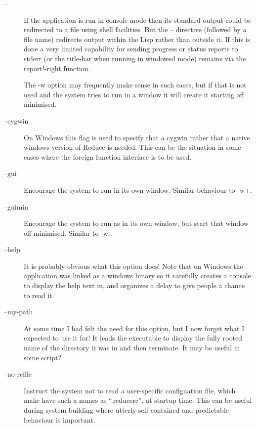 \documentclass[a4paper,11pt]{article}
\begin{document}
\begin{description}

\item [{\ttfamily --}] \index{{\ttfamily --}}
If the application is run in console mode then its standard output could
be redirected to a file using shell facilities. But the {\ttfamily --}
directive (followed by a file name) redirects output within the Lisp rather
than outside it. If this is done a very limited capability for sending
progress or status reports to stderr (or the title-bar when running in windowed
mode) remains via the {\ttfamily report!-right} function.
  
The {\ttfamily -w} option may frequently make sense in such cases, but if that
is not used and the system tries to run in a window it will create it
starting off minimised.

\item [{\ttfamily --cygwin}] 
On Windows this flag is used to specify that a cygwin rather that a native
windows version of Reduce is needed. This can be the situation in some
cases where the foreign function interface is to be used.

\item [{\ttfamily --gui}] 
Encourage the system to run in its own window. Similar behaviour
to {\ttfamily -w+}.

\item [{\ttfamily --guimin}] 
Encourage the system to run as in its own window, but
start that window off minimised. Similar
to {\ttfamily -w.}.

\item [{\ttfamily --help}] 
It is probably obvious what this option does! Note that on Windows the
application was linked as a windows binary so it carefully creates a
console to display the help text in, and organizes a delay to give
people a chance to read it.

\item [{\ttfamily --my-path}] 
At some time I had felt the need for this option, but I now forget what I
expected to use it for! It leads the executable to display the fully
rooted name of the directory it was in and then terminate. It may be useful
in some script?

\item [{\ttfamily --no-rcfile}] 
Instruct the system not to read a user-specific configuation file, which
make have such a names as ``{\ttfamily .reducerc}'', at startup time. This
can be useful during system building where utterly self-contained and
predictable behaviour is important.


\end{description}
\end{document}
